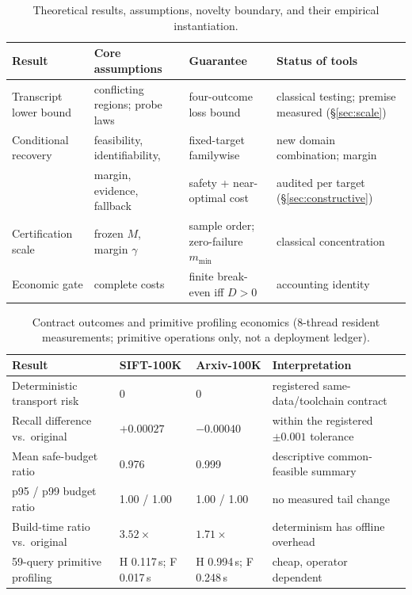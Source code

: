 \documentclass{article}
\begin{document}
\begin{table}[t]
\centering
\caption{Theoretical results, assumptions, novelty boundary, and their empirical instantiation.}
\label{tab:theory}
\footnotesize
\setlength{\tabcolsep}{3.5pt}
\begin{tabular}{p{2.5cm}p{3.3cm}p{3.5cm}p{3.5cm}}
\toprule
Result & Core assumptions & Guarantee & Status of tools \\
\midrule
Transcript lower bound & conflicting regions; probe laws & four-outcome loss bound & classical testing; premise measured (\S\ref{sec:scale}) \\
Conditional recovery & feasibility, identifiability, & fixed-target familywise & new domain combination; margin \\
 & margin, evidence, fallback & safety + near-optimal cost & audited per target (\S\ref{sec:constructive}) \\
Certification scale & frozen $M$, margin $\gamma$ & sample order; zero-failure $m_{\min}$ & classical concentration \\
Economic gate & complete costs & finite break-even iff $D>0$ & accounting identity \\
\bottomrule
\end{tabular}
\end{table}

\begin{table}[t]
\centering
\caption{Contract outcomes and primitive profiling economics (8-thread resident measurements; primitive
operations only, not a deployment ledger).}
\label{tab:contract}
\footnotesize
\setlength{\tabcolsep}{3.5pt}
\begin{tabular}{p{3.7cm}llp{4.2cm}}
\toprule
Result & SIFT-100K & Arxiv-100K & Interpretation \\
\midrule
Deterministic transport risk & 0 & 0 & registered same-data/toolchain contract \\
Recall difference vs.\ original & $+0.00027$ & $-0.00040$ & within the registered $\pm0.001$ tolerance \\
Mean safe-budget ratio & 0.976 & 0.999 & descriptive common-feasible summary \\
p95 / p99 budget ratio & 1.00 / 1.00 & 1.00 / 1.00 & no measured tail change \\
Build-time ratio vs.\ original & $3.52\times$ & $1.71\times$ & determinism has offline overhead \\
59-query primitive profiling & H 0.117\,s; F 0.017\,s & H 0.994\,s; F 0.248\,s & cheap, operator dependent \\
\bottomrule
\end{tabular}
\end{table}
\end{document}
